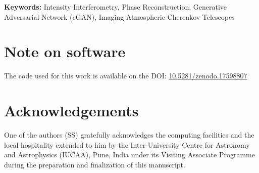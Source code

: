 \documentclass[twocolumn]{openjournal}
\begin{document}
\noindent
\textbf{Keywords:} {{Intensity Interferometry}, {Phase Reconstruction}, {Generative Adversarial Network (cGAN)}, {Imaging Atmospheric Cherenkov Telescopes}}








\section*{Note on software}

The code used for this work is available on the DOI:\hfil\break
\href{https://doi.org/10.5281/zenodo.17598807}{10.5281/zenodo.17598807}

\section*{Acknowledgements}
One of the authors (SS) gratefully acknowledges the computing facilities and the local hospitality extended to him by the Inter-University Centre for Astronomy and Astrophysics (IUCAA), Pune, India under its Visiting Associate Programme during the preparation and finalization of this manuscript.



\end{document}
